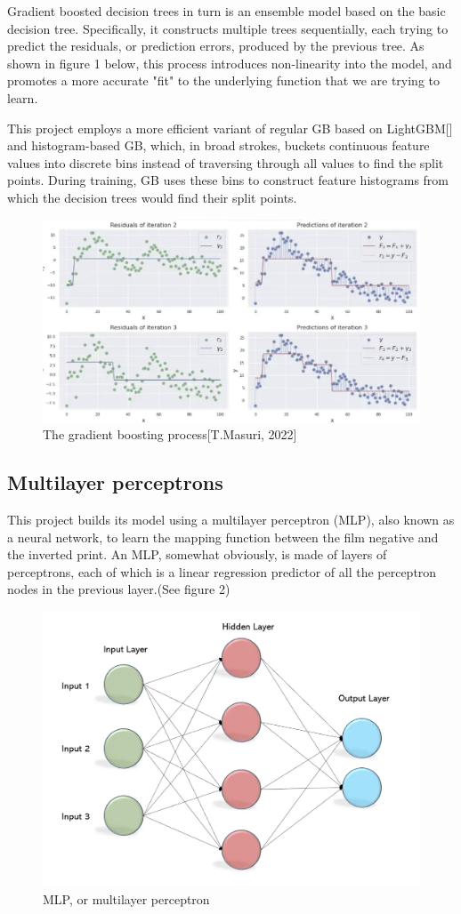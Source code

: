 \documentclass[twoside,11pt]{article}
\begin{document}
Gradient boosted decision trees in turn is an ensemble model based on the basic decision tree. Specifically, it constructs multiple trees 
sequentially, each trying to predict the residuals, or prediction errors, produced by the previous tree. As shown in figure 1 below, 
this process introduces non-linearity into the model, and promotes a more accurate "fit" to the underlying function that we are trying to learn.

This project employs a more efficient variant of regular GB based on LightGBM[\cite{lightgbm}] and histogram-based GB, 
which, in broad strokes, buckets continuous feature values into discrete bins instead of traversing through all values to find the split points. 
During training, GB uses these bins to construct feature histograms from which the decision trees would find their split points.

\begin{figure}
	\centering
	\includegraphics[width=0.7\linewidth]{GB.png}
	\caption{The gradient boosting process[T.Masuri, 2022]}
	\label{fig:GB}
\end{figure}

\subsection{Multilayer perceptrons}
\label{sec:prelims}
This project builds its model using a multilayer perceptron (MLP), also known as a neural network, to learn the mapping function between 
the film negative and the inverted print. An MLP, somewhat obviously, is made of layers of perceptrons, 
each of which is a linear regression predictor of all the perceptron nodes in the previous layer.(See figure 2)\\
\begin{figure}
	\centering
	\includegraphics[width=0.5\linewidth]{mlp.png}
	\caption{MLP, or multilayer perceptron}
	\label{fig:MLP}
\end{figure}
\end{document}

